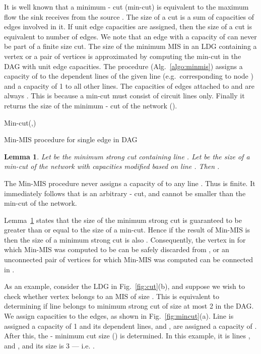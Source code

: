 \documentclass[journal]{IEEEtran}
\newtheorem{lemma}{Lemma}
\begin{document}
It is well known that a minimum - cut (min-cut) is equivalent to the maximum flow the sink  receives from the source  \cite{cormen2001introduction,ford1962flow}. The size of a cut is a sum of capacities of edges involved in it. If unit edge capacities are assigned, then the size of a cut is equivalent to number of edges.  We note that an edge with a capacity of  can never be part of a finite size cut.  The size of the minimum MIS in an LDG containing a vertex  or a pair of vertices  is approximated by computing the min-cut in the DAG with unit edge capacities. The procedure (Alg.\ \ref{algo:minmis}) assigns a capacity of  to the dependent lines of the given line (e.g.\ corresponding to node ) and a capacity of 1 to all other lines. The capacities of edges attached to  and  are always . This is because a min-cut must consist of circuit lines only.  Finally it returns the size of the minimum - cut of the network ().

\begin{algorithm} 
\BlankLine 
{}
{
\;
}
{
\;
}
\Return Min-cut(,)\;
\caption{Min-MIS procedure for single edge in DAG}
\label{algo:minmis} 
\end{algorithm} 

\begin{lemma} 
\label{lem:mincondition} 
Let  be the minimum strong cut containing line . Let  be the size of a min-cut of the network with capacities modified based on line . Then .  
\end{lemma}
\begin{IEEEproof}
The Min-MIS procedure never assigns a capacity of  to any line . Thus  is finite. It immediately follows that  is an arbitrary - cut, and cannot be smaller than the min-cut of the network. 
\end{IEEEproof}

Lemma~\ref{lem:mincondition} states that the size of the minimum strong cut is guaranteed to be greater than or equal to the size of a min-cut. Hence if the result of Min-MIS is  then the size of a minimum strong cut is also . Consequently, the vertex in  for which Min-MIS was computed to be  can be safely discarded from , or an unconnected pair of vertices for which Min-MIS was computed can be connected in . 

As an example, consider the  LDG in Fig.\ \ref{fig:cut}(b), and suppose we wish to check whether vertex  belongs to an MIS of size . This is equivalent to determining if line  belongs to minimum strong cut of size at most 2 in the DAG.  We assign capacities to the edges, as shown in Fig.\ \ref{fig:mincut}(a).  Line  is assigned a capacity of 1 and its dependent lines,  and , are assigned a capacity of .  After this, the - minimum cut size () is determined. In this example, it is lines ,  and , and its size is 3 --- i.e. .
\end{document}

